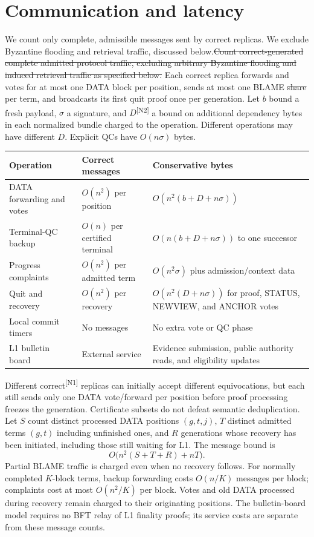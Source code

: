 \documentclass[11pt,a4paper]{article}
\newcommand{\NEW}[1]{{\color{diffNew}#1}}
\newcommand{\DEL}[1]{{\color{diffDel}\sout{#1}}}
\newcommand{\CH}[1]{\textsuperscript{\color{diffNew}\sffamily\scriptsize[#1]}}
\newcommand{\NEW}[1]{#1}
\newcommand{\DEL}[1]{}
\newcommand{\CH}[1]{}
\newcounter{protocol}
\begin{document}
\section{Communication and latency}
\label{sec:complexity}
\NEW{We count only complete, admissible messages sent by correct replicas.
We exclude Byzantine flooding and retrieval traffic, discussed
below.}\DEL{Count correct-generated complete admitted protocol traffic,
excluding arbitrary Byzantine flooding and induced retrieval traffic as
specified below.}
Each correct replica forwards and votes for at most one DATA
block per position, sends at most one BLAME \DEL{share} per term, and
broadcasts its first quit proof once per generation. Let $b$ bound a fresh
payload, $\sigma$ a signature, and \NEW{$D$}\CH{N2} a bound on additional
dependency bytes in each normalized bundle charged to the operation.
Different operations may have different $D$. Explicit QCs have
$O(n\sigma)$ bytes.

\begin{center}\small
\begin{tabularx}{\linewidth}{@{}>{\raggedright\arraybackslash}p{.24\linewidth}
 >{\raggedright\arraybackslash}p{.20\linewidth}Y@{}}
\toprule
Operation & Correct messages & Conservative bytes\\
\midrule
DATA forwarding and votes & $O(n^2)$ per position &
$O(n^2(b+D+n\sigma))$\\
Terminal-QC backup & $O(n)$ per certified terminal &
$O(n(b+D+n\sigma))$ to one successor\\
Progress complaints & $O(n^2)$ per admitted term &
$O(n^2\sigma)$ plus admission/context data\\
Quit and recovery & $O(n^2)$ per recovery &
$O(n^2(D+n\sigma))$ for proof, STATUS, NEWVIEW, and ANCHOR votes\\
Local \NEW{commit} timers & No messages & No extra vote or QC phase\\
L1 bulletin board & External service & Evidence submission, public authority
reads, and eligibility updates\\
\bottomrule
\end{tabularx}
\end{center}
Different \NEW{correct}\CH{N1} replicas can initially accept different
equivocations, but each still sends only one DATA vote/forward per position
before proof processing freezes the generation. Certificate subsets do not
defeat semantic deduplication. Let $S$ count distinct processed DATA
positions $(g,t,j)$, $T$ distinct admitted terms $(g,t)$ including
unfinished ones, and $R$ generations whose recovery has been initiated,
including those still waiting for L1. The message bound is
\[
 O\bigl(n^2(S+T+R)+nT\bigr).
\]
Partial BLAME traffic is charged even when no recovery follows. For
normally completed $K$-block terms, backup forwarding costs $O(n/K)$
messages per block; complaints cost at most $O(n^2/K)$ per block.
Votes and old DATA processed during recovery remain charged to their
originating positions. The bulletin-board model requires no BFT relay of
L1 finality proofs; its service costs are separate from these message counts.
\end{document}
